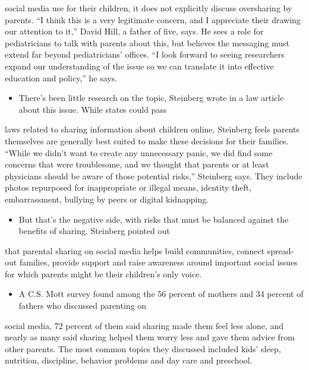 \documentclass[UTF8,11pt]{ctexart}
\begin{document}
social media use for their children, it does not explicitly discuss oversharing by parents. “I think this is a very legitimate concern, and I appreciate their drawing our attention to it,” David Hill, a father of five, says. He sees a role for pediatricians to talk with parents about this, but believes the messaging must extend far beyond pediatricians’ offices. “I look forward to seeing researchers expand our understanding of the issue so we can translate it into effective education and policy,” he says.


\begin{itemize}[leftmargin=2em,itemsep=.2em,topsep=.4em]\item[G.] There’s been little research on the topic, Steinberg wrote in a law article about this issue. While states could pass
\end{itemize}

laws related to sharing information about children online, Steinberg feels parents themselves are generally best suited to make these decisions for their families. “While we didn’t want to create any unnecessary panic, we did find some concerns that were troublesome, and we thought that parents or at least physicians should be aware of those potential risks,” Steinberg says. They include photos repurposed for inappropriate or illegal means, identity theft, embarrassment, bullying by peers or digital kidnapping.


\begin{itemize}[leftmargin=2em,itemsep=.2em,topsep=.4em]\item[H.] But that’s the negative side, with risks that must be balanced against the benefits of sharing. Steinberg pointed out
\end{itemize}

that parental sharing on social media helps build communities, connect spread-out families, provide support and raise awareness around important social issues for which parents might be their children’s only voice.


\begin{itemize}[leftmargin=2em,itemsep=.2em,topsep=.4em]\item[I.] A C.S. Mott survey found among the 56 percent of mothers and 34 percent of fathers who discussed parenting on
\end{itemize}

social media, 72 percent of them said sharing made them feel less alone, and nearly as many said sharing helped them worry less and gave them advice from other parents. The most common topics they discussed included kids’ sleep, nutrition, discipline, behavior problems and day care and preschool.
\end{document}
